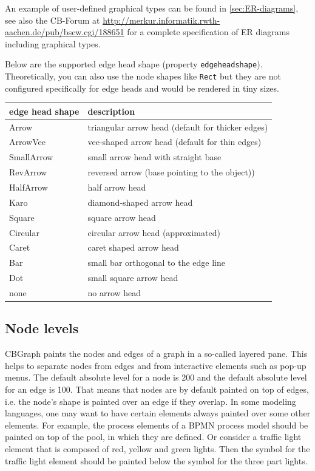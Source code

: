 An example of user-defined graphical types can be found in \ref{sec:ER-diagrams},
see also the CB-Forum at
\url{http://merkur.informatik.rwth-aachen.de/pub/bscw.cgi/188651}
for a complete specification of ER diagrams including graphical types.

Below are the supported edge head shape (property {\tt edgeheadshape}). Theoretically,
you can also use the node shapes like {\tt Rect} but they are not configured
specifically for edge heads and would be rendered in tiny sizes.
\vspace{0.2cm}

\begin{tabular}{|p{4cm}|p{8
cm}|}
\hline
{\bf edge head shape} & {\bf description} \\ \hline \hline
Arrow & triangular arrow head (default for thicker edges) \\ \hline
ArrowVee & vee-shaped arrow head (default for thin edges) \\ \hline
SmallArrow & small arrow head with straight base \\ \hline
RevArrow & reversed arrow (base pointing to the object)) \\ \hline
HalfArrow & half arrow head \\ \hline
Karo & diamond-shaped arrow head  \\ \hline
Square & square arrow head  \\ \hline
Circular & circular arrow head (approximated)  \\ \hline
Caret & caret shaped arrow head \\ \hline
Bar & small bar orthogonal to the edge line \\ \hline
Dot & small square arrow head \\ \hline
none & no arrow head \\ \hline
\end{tabular}

\vspace{0.7cm}


\subsection{Node levels}
\label{sec:nodelevel}

CBGraph paints the nodes and edges of a graph in a so-called layered pane. This helps
to separate nodes from edges and from interactive elements such as pop-up menus.
The default absolute level for a node is 200 and the default absolute level for an edge is
100. That means that nodes are by default painted on top of edges, i.e. the node's shape
is painted over an edge if they overlap. In some modeling languages, one may want to
have certain elements always painted over some other elements. For example, the process
elements of a BPMN process model should be painted on top of the pool, in which they are defined.
Or consider a traffic light element that is composed of red, yellow and green lights. Then the symbol
for the traffic light element should be painted below the symbol for the three part lights.


